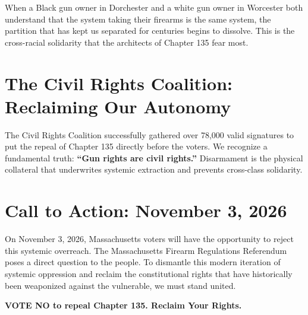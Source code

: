 \documentclass[12pt]{article}
\begin{document}
When a Black gun owner in Dorchester and a white gun owner in Worcester both understand that the system taking their firearms is the same system, the partition that has kept us separated for centuries begins to dissolve. This is the cross-racial solidarity that the architects of Chapter 135 fear most.

\section{The Civil Rights Coalition: Reclaiming Our Autonomy}
The Civil Rights Coalition successfully gathered over 78,000 valid signatures to put the repeal of Chapter 135 directly before the voters. We recognize a fundamental truth: \textbf{``Gun rights are civil rights.''} Disarmament is the physical collateral that underwrites systemic extraction and prevents cross-class solidarity.

\section{Call to Action: November 3, 2026}
On November 3, 2026, Massachusetts voters will have the opportunity to reject this systemic overreach. The Massachusetts Firearm Regulations Referendum poses a direct question to the people. To dismantle this modern iteration of systemic oppression and reclaim the constitutional rights that have historically been weaponized against the vulnerable, we must stand united.

\textbf{VOTE NO to repeal Chapter 135. Reclaim Your Rights.}
\end{document}
